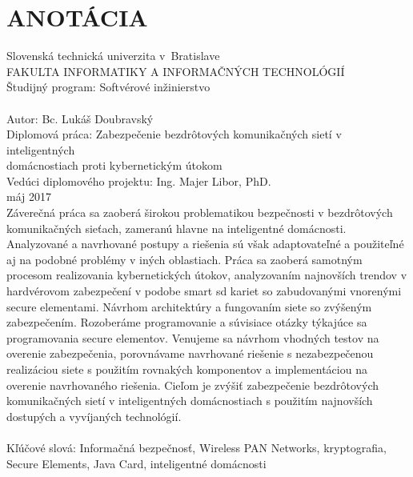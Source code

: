 \documentclass[12pt,a4wide,oneside,openright]{report}
\begin{document}
\newpage
\thispagestyle{empty}
\mbox{}

\onehalfspacing
\chapter*{ANOTÁCIA}	
\thispagestyle{empty}
\noindent Slovenská technická univerzita v~Bratislave \\
FAKULTA INFORMATIKY A INFORMAČNÝCH TECHNOLÓGIÍ \\
Študijný program: Softvérové inžinierstvo \\ \\
Autor: Bc. Lukáš Doubravský \\
Diplomová práca: 
Zabezpečenie bezdrôtových komunikačných sietí v inteligentných\\ domácnostiach proti kybernetickým útokom  \\
Vedúci diplomového projektu: Ing. Majer Libor, PhD. \\
máj 2017 \\

Záverečná práca sa zaoberá širokou problematikou bezpečnosti v bezdrôtových komunikačných sieťach, zameranú hlavne na inteligentné domácnosti. Analyzované a navrhované postupy a riešenia sú však adaptovateľné a použiteľné aj na podobné problémy v iných oblastiach.
Práca sa zaoberá samotným procesom realizovania kybernetických útokov, analyzovaním najnovších trendov v hardvérovom zabezpečení v podobe smart sd kariet so zabudovanými vnorenými secure elementami. Návrhom architektúry a fungovaním siete so zvýšeným zabezpečením.
Rozoberáme programovanie a súvisiace otázky týkajúce sa programovania secure elementov.
Venujeme sa návrhom vhodných testov na overenie zabezpečenia, porovnávame navrhované riešenie s nezabezpečenou realizáciou siete s použitím rovnakých komponentov a implementáciou na overenie navrhovaného riešenia.
Cieľom je zvýšiť zabezpečenie bezdrôtových komunikačných sietí v inteligentných domácnostiach s použitím najnovších dostupých a vyvíjaných technológií.
\\ \\
Kľúčové slová: Informačná bezpečnosť, Wireless PAN Networks, kryptografia, Secure Elements, Java Card, inteligentné domácnosti

\end{document}
